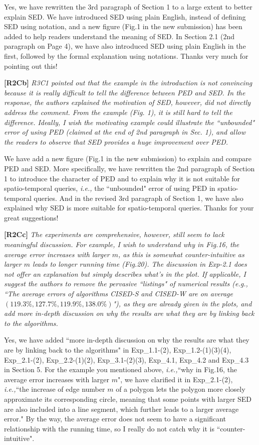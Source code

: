 \documentclass{letter}
\newcommand{\ie}{\emph{i.e.,}\xspace}
\begin{document}
Yes, we have rewritten the 3rd paragraph of Section 1 to a large extent to better explain SED. We have introduced SED using plain English, instead of defining SED using notation, and a new figure (Fig.1 in the new submission) has been added to help readers understand the meaning of SED.
{In Section 2.1 (2nd paragraph on Page 4), we have also introduced SED using plain English in the first, followed by the formal explanation using notations.}
Thanks very much for pointing out this!


\textbf{[R2Cb]} \emph{{R3C1} pointed out that the example in the introduction is not convincing because it is really difficult to tell the difference between PED and SED. In the response, the authors explained the motivation of SED, however, did not directly address the comment. From the example (Fig. 1), it is still hard to tell the difference. Ideally, I wish the motivating example could illustrate the ``unbounded" error of using PED (claimed at the end of 2nd paragraph in Sec. 1), and allow the readers to observe that SED provides a huge improvement over PED.}

We have add a new figure (Fig.1 in the new submission) to explain and compare PED and SED. More specifically, we have rewritten the 2nd paragraph of Section 1 to introduce the character of PED and to explain why it is not suitable for spatio-temporal queries, \ie the ``unbounded" error of using PED in spatio-temporal queries. And in the revised 3rd paragraph of Section 1, we have also explained why SED is more suitable for spatio-temporal queries.
Thanks for your great suggestions!

\textbf{[R2Cc]} \emph{The experiments are comprehensive, however, still seem to lack meaningful discussion. For example, I wish to understand why in Fig.16, the average error increases with larger $m$, as this is somewhat counter-intuitive as larger $m$ leads to longer running time (Fig.20). The discussion in Exp-2.1 does not offer an explanation but simply describes what's in the plot. If applicable, I suggest the authors to remove the pervasive ``listings" of numerical results (e.g., ``The average errors of algorithms CISED-S and CISED-W are on average $(119.3\%, 127.7\%, 119.9\%, 138.0\%)$"), as they are already given in the plots, and add more in-depth discussion on why the results are what they are by linking back to the algorithms. }

Yes, we have added ``more in-depth discussion on why the results are what they are by linking back to the algorithms" in Exp\_1.1-(2), Exp\_1.2-(1)(3)(4), Exp\_2.1-(2), Exp\_2.2-(1)(2), Exp\_3.1-(2)(3), Exp\_4.1, Exp\_4.2 and Exp\_4.3 in Section 5.
For the example you mentioned above,  \ie ``why in Fig.16, the average error increases with larger $m$", we have clarified it in Exp\_2.1-(2), \ie ``the increase of edge number $m$ of a polygon lets the polygon more closely approximate its corresponding circle, meaning that some points with larger SED are also included into a line segment, which further leads to a larger average error." {By the way, the average error does not seem to have a significant relationship with the running time, so I really do not catch why it is ``counter-intuitive".}
\end{document}
